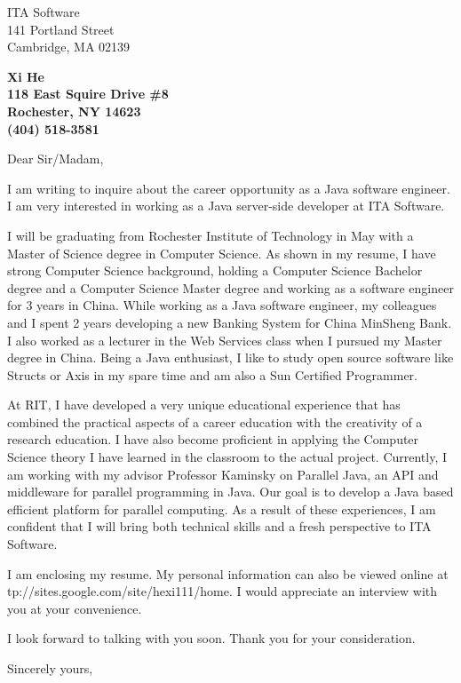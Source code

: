 \documentclass[10pt]{letter} %
\makeatletter
\newcommand*\wrapletters[1]{\wr@pletters#1\@nil}
\newcommand{\company}{ITA Software}
\newcommand{\addr}{141 Portland Street\\Cambridge, MA 02139}
\newcommand{\position}{Java software engineer}
\newcommand{\technique}{Java server-side developer }
\def\wr@pletters#1#2\@nil{#1\allowbreak\if&#2&\else\wr@pletters#2\@nil\fi}
\makeatother
\begin{document}
\signature{Xi He}                  %
\longindentation=0pt                       %
\let\raggedleft\raggedright                %
 
\begin{letter}{\company \\ \addr}

\begin{center}
\large\bf Xi He\\
118 East Squire Drive \#8\\ Rochester, NY 14623 \\ (404) 518-3581
\end{center} 
\vfill %


 
\opening{Dear Sir/Madam,} 
 
\noindent I am writing to inquire about the career opportunity as a \position.
I am very interested in working as a \technique at \company. 
 
\noindent I will be graduating from Rochester Institute of Technology in May with a Master of Science degree in Computer Science. As shown in my resume, I have strong Computer Science background, holding a Computer Science Bachelor degree and a Computer Science Master degree and working as a software engineer for 3 years in China. While working as a Java software engineer, my colleagues and I spent 2 years developing a new Banking System for China MinSheng Bank.  I also worked as a lecturer in the Web Services class when I pursued my Master degree in China. Being a Java enthusiast, I like to study open source software like Structs or Axis in my spare time and am also a Sun Certified Programmer. 

At RIT, I have developed a very unique educational experience that has combined the practical aspects of a career education with the creativity of a research education. I have also become proficient in applying the Computer Science theory I have learned in the classroom to the actual project. Currently, I am working with my advisor Professor Kaminsky on Parallel Java, an API and middleware for parallel programming in Java. Our goal is to develop a Java based efficient platform for parallel computing. As a result of these experiences, I am confident that I will bring both technical skills and a fresh perspective to \company.
 
\noindent I am enclosing my resume. My personal information can also be viewed online at \wrapletters{http://sites.google.com/site/hexi111/home}.
I would appreciate an interview with you at your convenience. 

I look forward to talking with you soon. Thank you for your consideration.
 
\closing{Sincerely yours,}
 
 
\encl{}  				%

\end{letter}
 
\end{document}
